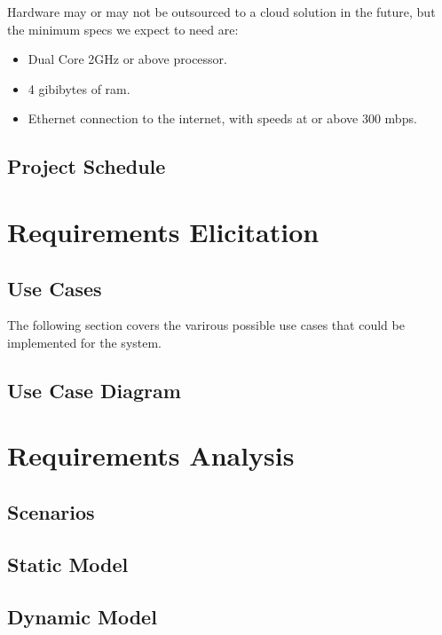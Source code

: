 \documentclass[letter,12pt]{report}
\begin{document}
Hardware may or may not be outsourced to a cloud solution in the future,
but the minimum specs we expect to need are:

\begin{itemize}
\item Dual Core 2GHz or above processor.
\item 4 gibibytes of ram.
\item Ethernet connection to the internet, with speeds at or above 300 mbps.
\end{itemize}


\section{Project Schedule}






\chapter{Requirements Elicitation}

\section{Use Cases}
The following section covers the varirous possible use cases
that could be implemented for the system.









\section{Use Case Diagram}

\chapter{Requirements Analysis}

\section{Scenarios}

\section{Static Model}

\section{Dynamic Model}
\end{document}
